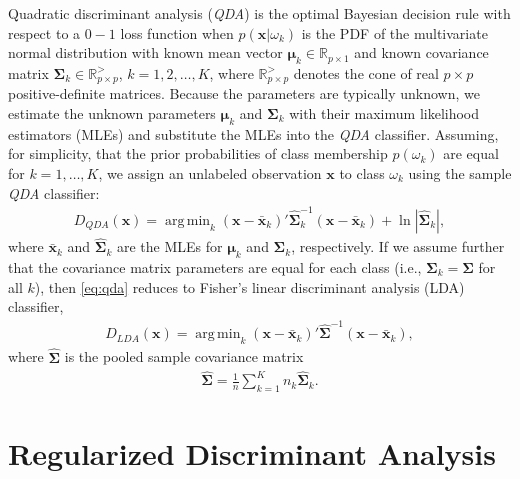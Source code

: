 \documentclass[11pt]{article}
\newcommand{\xbar}{\bar{\bm x}}
\DeclareMathOperator*{\argmin}{arg\,min}
\begin{document}
Quadratic discriminant analysis (\emph{QDA}) is the optimal Bayesian decision rule with respect to a $0-1$ loss function when $p(\bm x | \omega_k)$ is the PDF of the multivariate normal distribution with known mean vector  $\bm\mu_k \in \mathbb{R}_{p \times 1}$ and known covariance matrix $\bm\Sigma_k \in \mathbb{R}_{p \times p}^{>}$, $k = 1, 2, \ldots, K$, where $\mathbb{R}_{p \times p}^{>}$ denotes the cone of real $p \times p$ positive-definite matrices. Because the parameters are typically unknown, we estimate the unknown parameters $\bm \mu_k$ and $\bm\Sigma_k$ with their maximum likelihood estimators (MLEs) and substitute the MLEs into the \emph{QDA} classifier. Assuming, for simplicity, that the prior probabilities of class membership $p(\omega_k)$ are equal for $k = 1, \ldots, K$, we assign an unlabeled observation $\bm x$ to class $\omega_k$ using the sample \emph{QDA} classifier:
\begin{align}
	D_{QDA}(\bm x) = \argmin_{k}  (\bm x - \xbar_k)'\widehat{\bm\Sigma}_k^{-1}(\bm x - \xbar_k)  + \ln |\widehat{\bm\Sigma}_k|, \label{eq:qda}
\end{align}
where $\xbar_k$ and $\widehat{\bm\Sigma}_k$ are the MLEs for $\bm \mu_k$ and $\bm \Sigma_k$, respectively. If we assume further that the covariance matrix parameters are equal for each class (i.e., $\bm\Sigma_k = \bm\Sigma$ for all $k$), then \eqref{eq:qda} reduces to Fisher's linear discriminant analysis (LDA) classifier,
\begin{align}
	D_{LDA}(\bm x) = \argmin_{k}  (\bm x - \xbar_k)'\widehat{\bm\Sigma}^{-1}(\bm x - \xbar_k), \label{eq:lda}
\end{align}
where $\widehat{\bm\Sigma}$ is the pooled sample covariance matrix
\begin{align}
	\widehat{\bm\Sigma} = \frac{1}{n} \sum_{k=1}^K n_k \widehat{\bm\Sigma}_k. \label{eq:pooled-cov}
\end{align}

\section{Regularized Discriminant Analysis}
\end{document}
